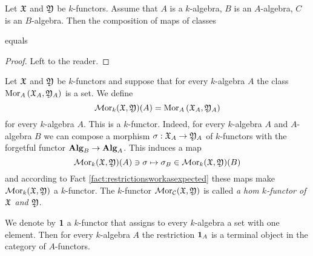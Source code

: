 \begin{fact}\label{fact:restrictionsworkasexpected}
Let ${\mathfrak X}$ and ${\mathfrak Y}$ be $k$-functors. Assume that $A$ is a $k$-algebra, $B$ is an $A$-algebra, $C$ is an $B$-algebra. Then the composition of maps of classes
\begin{center}
\end{center}
equals
\begin{center}
\end{center}
\end{fact}
\begin{proof}
Left to the reader.
\end{proof}

\begin{definition}
Let ${\mathfrak X}$ and ${\mathfrak Y}$ be $k$-functors and suppose that for every $k$-algebra $A$ the class $\mathrm{Mor}_A\left({\mathfrak X}_A,{\mathfrak Y}_A\right)$ is a set. We define
$$\mathcal{M}\mathrm{or}_k({\mathfrak X},{\mathfrak Y})(A)=\mathrm{Mor}_A\left({\mathfrak X}_A,{\mathfrak Y}_A\right)$$
for every $k$-algebra $A$. This is a $k$-functor. Indeed, for every $k$-algebra $A$ and $A$-algebra $B$ we can compose a morphism $\sigma:{\mathfrak X}_A\rightarrow {\mathfrak Y}_A$ of $k$-functors with the forgetful functor $\mathbf{Alg}_B \rightarrow \mathbf{Alg}_A$. This induces a map 
$$\mathcal{M}\mathrm{or}_{k}({\mathfrak X},{\mathfrak Y})(A)\ni \sigma \mapsto \sigma_{B}\in \mathcal{M}\mathrm{or}_{k}({\mathfrak X},{\mathfrak Y})(B)$$
and according to Fact \ref{fact:restrictionsworkasexpected} these maps make $\mathcal{M}\mathrm{or}_{k}({\mathfrak X},{\mathfrak Y})$ a $k$-functor. The $k$-functor $\mathcal{M}\mathrm{or}_{{\mathcal C}}({\mathfrak X},{\mathfrak Y})$ is called \textit{a hom $k$-functor of ${\mathfrak X}$ and ${\mathfrak Y}$}.
\end{definition}
\noindent
We denote by $\mathbf{1}$ a $k$-functor that assigns to every $k$-algebra a set with one element. Then for every $k$-algebra $A$ the restriction $\mathbf{1}_A$ is a terminal object in the category of $A$-functors.

